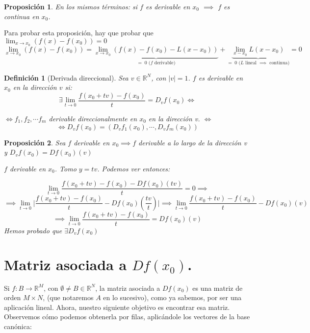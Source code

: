 \documentclass[11pt, a4paper, titlepage]{article}
\makeatletter
\renewenvironment{proof}[1][\proofname] {\vspace{-15pt}\par\pushQED{\qed}\normalfont\topsep6\p@\@plus6\p@\relax\trivlist\item[\hskip\labelsep\it#1\@addpunct{.}]\ignorespaces}{\popQED\endtrivlist\@endpefalse}
\providecommand{\abs}[1]{\lvert#1\rvert}
\theoremstyle{theorem-style}
\newtheorem*{nprop}{Proposición}
\theoremstyle{definition-style}
\newtheorem*{ndef}{Definición}
\theoremstyle{remark-style}
\theoremstyle{example-style}
\makeatother
\begin{document}
\begin{nprop} En los mismos términos: si $f$ es derivable en $x_0$ $\implies$ $f$ es continua en $x_0$.
	
\end{nprop}

\begin{proof} Para probar esta proposición, hay que probar que $\lim_{x\to x_0} (f(x)-f(x_0)) = 0$
\[
	\lim_{x\to x_0} (f(x)-f(x_0)) = \underbrace{\lim_{x\to x_0} (f(x)-f(x_0)-L(x-x_0))}_{=\;0 \text{ ($f$ derivable)}} + \underbrace{\lim_{x-x_0} L(x-x_0)}_{=\; 0 \text{ ($L$ lineal $\implies$ continua)}} = 0
\]
\end{proof}

\begin{ndef}[Derivada direccional]
	Sea $v\in \mathbb{R}^N$, con $|v| = 1$. $f$ es derivable en $x_0$ en la dirección $v$ si:
	\[
		\exists \lim_{t\to 0} \frac{f(x_0+tv)-f(x_0)}{t} = D_v f(x_0) \iff
	\]
	
	\begin{center}
	$\iff f_1,f_2,\cdots f_m$ derivable direccionalmente en $x_0$ en la dirección v. $\iff$
	\[
	\iff D_vf(x_0) = (D_vf_1(x_0),\cdots,D_vf_m(x_0))
	\]
\end{center}
\end{ndef}


\begin{nprop}
	Sea $f$ derivable en $x_0\implies f$ derivable a lo largo de la dirección v y $D_vf(x_0) = Df(x_0)(v)$
	\begin{proof}
	$f$ derivable en $x_0$. Tomo $y=tv  $. Podemos ver entonces:
	
	\[
	\lim_{t \to 0} \frac{f(x_0 +tv) - f(x_0) - Df(x_0)(tv)}{t} = 0 \implies
	\]
	\[
	\implies \lim_{t \to 0} \abs{\frac{f(x_0 +tv) - f(x_0)}{t} - Df(x_0)(\frac{tv}{t})} \implies \lim_{t \to 0}\frac{f(x_0 +tv) -f(x_0)}{t} - Df(x_0)(v)
	\]
	\[
	\implies \lim_{t \to 0}\frac{f(x_0 +tv) - f(x_0)}{t} = Df(x_0)(v)
	\]
Hemos probado que $\exists D_vf(x_0)$
\end{proof}
\end{nprop}


\section{Matriz asociada a $Df(x_0)$.}
	Si $f : B \longrightarrow \mathbb{R}^M$, con $\emptyset \ne B \in \mathbb{R}^N$, la matriz asociada a $Df(x_0)$ es una matriz de orden $M \times N$, (que notaremos $A$ en lo sucesivo), como ya sabemos, por ser una aplicación lineal. Ahora, nuestro siguiente objetivo es encontrar esa matriz. Observemos cómo podemos obtenerla por filas, aplicándole los vectores de la base canónica:
	
\end{document}

